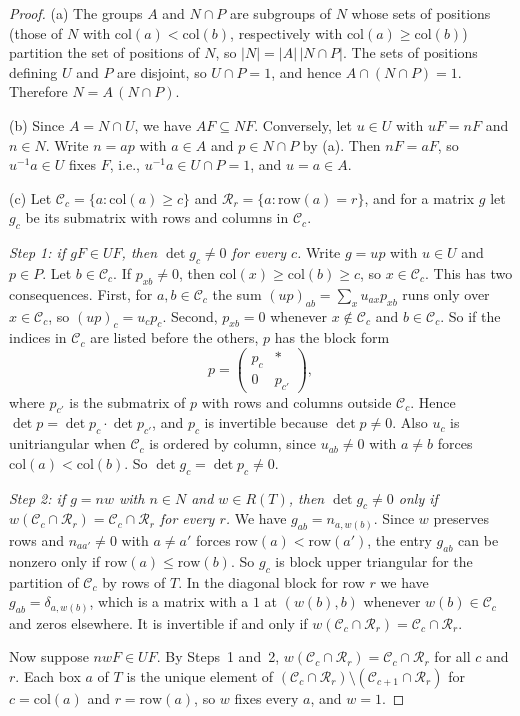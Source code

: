 \documentclass[11pt, letterpaper]{amsart}
\theoremstyle{definition}
\theoremstyle{remark}
\newcommand{\row}{\mathrm{row}}
\newcommand{\col}{\mathrm{col}}
\begin{document}
\begin{proof}
(a) The groups $A$ and $N\cap P$ are subgroups of $N$ whose sets of positions (those of $N$ with $\col(a)<\col(b)$, respectively with $\col(a)\ge\col(b)$) partition the set of positions of $N$, so $|N|=|A|\,|N\cap P|$. The sets of positions defining $U$ and $P$ are disjoint, so $U\cap P=1$, and hence $A\cap(N\cap P)=1$. Therefore $N=A\,(N\cap P)$.

(b) Since $A=N\cap U$, we have $AF\subseteq NF$. Conversely, let $u\in U$ with $uF=nF$ and $n\in N$. Write $n=ap$ with $a\in A$ and $p\in N\cap P$ by (a). Then $nF=aF$, so $u^{-1}a\in U$ fixes $F$, i.e., $u^{-1}a\in U\cap P=1$, and $u=a\in A$.

(c) Let $\mathcal C_c=\{a:\col(a)\ge c\}$ and $\mathcal R_r=\{a:\row(a)=r\}$, and for a matrix $g$ let $g_c$ be its submatrix with rows and columns in $\mathcal C_c$.

\emph{Step 1: if $gF\in UF$, then $\det g_c\ne0$ for every $c$.} Write $g=up$ with $u\in U$ and $p\in P$. Let $b\in\mathcal C_c$. If $p_{xb}\ne0$, then $\col(x)\ge\col(b)\ge c$, so $x\in\mathcal C_c$. This has two consequences. First, for $a,b\in\mathcal C_c$ the sum $(up)_{ab}=\sum_xu_{ax}p_{xb}$ runs only over $x\in\mathcal C_c$, so $(up)_c=u_cp_c$. Second, $p_{xb}=0$ whenever $x\notin\mathcal C_c$ and $b\in\mathcal C_c$. So if the indices in $\mathcal C_c$ are listed before the others, $p$ has the block form
\[
p=\begin{pmatrix}p_c&*\\0&p_{c'}\end{pmatrix},
\]
where $p_{c'}$ is the submatrix of $p$ with rows and columns outside $\mathcal C_c$. Hence $\det p=\det p_c\cdot\det p_{c'}$, and $p_c$ is invertible because $\det p\ne0$. Also $u_c$ is unitriangular when $\mathcal C_c$ is ordered by column, since $u_{ab}\ne0$ with $a\ne b$ forces $\col(a)<\col(b)$. So $\det g_c=\det p_c\ne0$.

\emph{Step 2: if $g=nw$ with $n\in N$ and $w\in R(T)$, then $\det g_c\ne0$ only if $w(\mathcal C_c\cap\mathcal R_r)=\mathcal C_c\cap\mathcal R_r$ for every $r$.} We have $g_{ab}=n_{a,w(b)}$. Since $w$ preserves rows and $n_{aa'}\ne0$ with $a\ne a'$ forces $\row(a)<\row(a')$, the entry $g_{ab}$ can be nonzero only if $\row(a)\le\row(b)$. So $g_c$ is block upper triangular for the partition of $\mathcal C_c$ by rows of $T$. In the diagonal block for row $r$ we have $g_{ab}=\delta_{a,w(b)}$, which is a matrix with a $1$ at $(w(b),b)$ whenever $w(b)\in\mathcal C_c$ and zeros elsewhere. It is invertible if and only if $w(\mathcal C_c\cap\mathcal R_r)=\mathcal C_c\cap\mathcal R_r$.

Now suppose $nwF\in UF$. By Steps~1 and~2, $w(\mathcal C_c\cap\mathcal R_r)=\mathcal C_c\cap\mathcal R_r$ for all $c$ and $r$. Each box $a$ of $T$ is the unique element of $(\mathcal C_c\cap\mathcal R_r)\setminus(\mathcal C_{c+1}\cap\mathcal R_r)$ for $c=\col(a)$ and $r=\row(a)$, so $w$ fixes every $a$, and $w=1$.
\end{proof}
\end{document}
